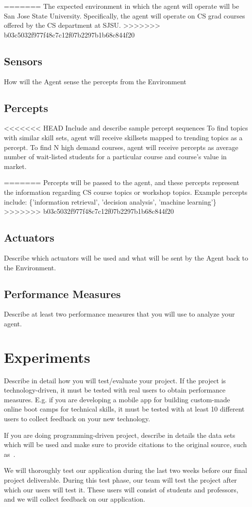 \documentclass{article}
\begin{document}
=======
The expected environment in which the agent will operate will be San Jose State University. Specifically, the agent will operate on CS grad courses offered by the CS department at SJSU. 
>>>>>>> b03c5032f977f48c7c12f07b2297b1b68c844f20
\subsection{Sensors}
How will the Agent sense the percepts from the Environment



\subsection{Percepts}
<<<<<<< HEAD
Include and describe sample percept sequences
To find topics with similar skill sets, agent will receive skillsets mapped to trending topics as a percept.
To find N high demand courses, agent will receive percepts as average number of wait-listed students for a particular course and course's value in market.

=======
Percepts will be passed to the agent, and these percepts represent the information regarding CS course topics or workshop topics. Example percepts include: 
\{'information retrieval', 'decision analysis', 'machine learning'\}
>>>>>>> b03c5032f977f48c7c12f07b2297b1b68c844f20
\subsection{Actuators}
Describe which actuators will be used and what will be sent by the Agent back to the Environment.
\subsection{Performance Measures}
Describe at least two performance measures that you will use to analyze your agent.

\section{Experiments}
Describe in detail how you will test/evaluate your project.
If the project is technology-driven, it must be tested with real users to obtain performance measures.  E.g. if you are developing a mobile app for building custom-made online boot camps for technical skills, it must be tested with at least 10 different users to collect feedback on your new technology.

If you are doing programming-driven project, describe in details the data sets which will be used and make sure to provide citations to the original source, such as~\cite{knuthwebsite}. 

We will thoroughly test our application during the last two weeks before our final project deliverable. During this test phase, our team will test the project after which our users will test it. These users will consist of students and professors, and we will collect feedback on our application. 

 

\end{document}
